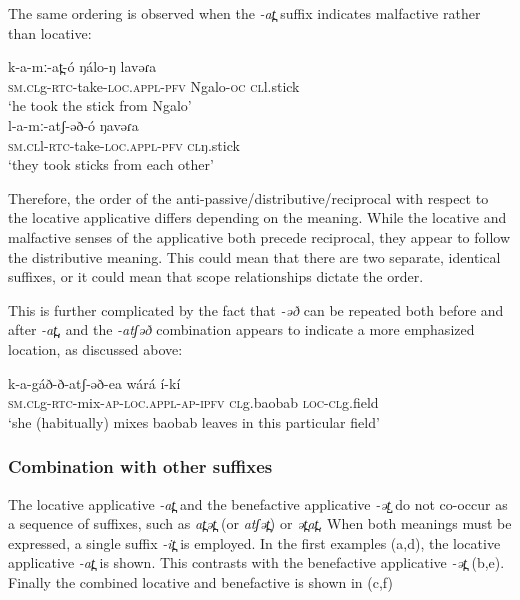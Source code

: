 The same ordering is observed when the \textit{-at̪} suffix indicates malfactive rather than locative:

\ea
\ea \gll k-a-mː-at̪-ó 			ŋálo-ŋ 		lavəɾa\\
\textsc{sm.cl}g-\textsc{rtc}-take-\textsc{loc.appl-\textsc{pfv}}	Ngalo-\textsc{oc}	\textsc{cl}l.stick\\
\trans ‘he took the stick from Ngalo’\\

\ex \gll	l-a-mː-atʃ-əð-ó 			ŋavəɾa\\
\textsc{sm.cl}l-\textsc{rtc}-take-\textsc{loc.appl-\textsc{pfv}}	\textsc{cl}ŋ.stick\\
\trans ‘they took sticks from each other’\\
\z
\z

Therefore, the order of the anti-passive/distributive/reciprocal with respect to the locative applicative differs depending on the meaning. While the locative and malfactive senses of the applicative both precede reciprocal, they appear to follow the distributive meaning. This could mean that there are two separate, identical suffixes, or it could mean that scope relationships dictate the order. 


This is further complicated by the fact that \textit{-əð} can be repeated both before and after \textit{-at̪}, and the \textit{-atʃəð} combination appears to indicate a more emphasized location, as discussed above:

\ea
\gll k-a-gáð-ð-atʃ-əð-ea 				wárá 		í-kí	\\
\textsc{sm.cl}g-\textsc{rtc}-mix-\textsc{ap-loc.appl-ap-\textsc{ipfv}}		\textsc{cl}g.baobab	\textsc{loc-cl}g.field\\
\trans ‘she (habitually) mixes baobab leaves in this particular field’\\
\z


\subsubsection{Combination with other suffixes}
The locative applicative \textit{-at̪} and the benefactive applicative \textit{-ət̺} do not co-occur as a sequence of suffixes, such as \textit{at̪ət̪} (or \textit{atʃət̪}) or \textit{ət̪at̪}. When both meanings must be expressed, a single suffix \textit{-it̪} is employed. In the first examples (a,d), the locative applicative \textit{-at̪} is shown. This contrasts with the benefactive applicative \textit{-ət̪} (b,e). Finally the combined locative and benefactive is shown in (c,f)

